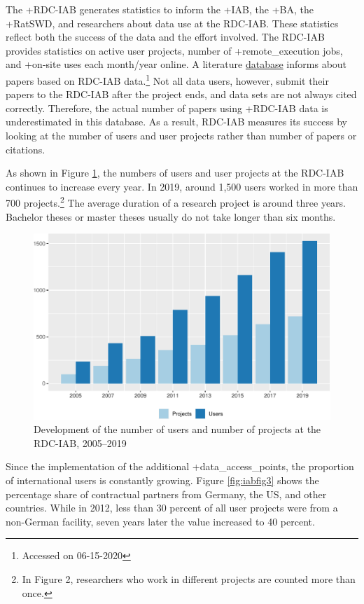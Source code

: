 \documentclass[
]{WileySix}
\begin{document}
The +RDC-IAB\textbar{} generates statistics to inform the +IAB\textbar, the +BA\textbar, the +RatSWD\textbar, and researchers about data use at the RDC-IAB. These statistics reflect both the success of the data and the effort involved. The RDC-IAB provides statistics on active user projects, number of +remote\_execution\textbar{} jobs, and +on-site\textbar{} uses each month/year online. A literature \href{https://fdz.iab.de/en/FDZ_Publications/FDZ_Literature_Database.aspx}{database} informs about papers based on RDC-IAB data.\footnote{Accessed on 06-15-2020} Not all data users, however, submit their papers to the RDC-IAB after the project ends, and data sets are not always cited correctly. Therefore, the actual number of papers using +RDC-IAB\textbar{} data is underestimated in this database. As a result, RDC-IAB measures its success by looking at the number of users and user projects rather than number of papers or citations.

As shown in Figure \ref{fig:iabfig2}, the numbers of users and user projects at the RDC-IAB continues to increase every year. In 2019, around 1,500 users worked in more than 700 projects.\footnote{In Figure 2, researchers who work in different projects are counted more than once.} The average duration of a research project is around three years. Bachelor theses or master theses usually do not take longer than six months.

\begin{figure}
\centering
\includegraphics{figures/iabfig2-1.pdf}
\caption{\label{fig:iabfig2}Development of the number of users and number of projects at the RDC-IAB, 2005--2019}
\end{figure}

Since the implementation of the additional +data\_access\_points\textbar, the proportion of international users is constantly growing. Figure \ref{fig:iabfig3} shows the percentage share of contractual partners from Germany, the US, and other countries. While in 2012, less than 30 percent of all user projects were from a non-German facility, seven years later the value increased to 40 percent.
\end{document}
